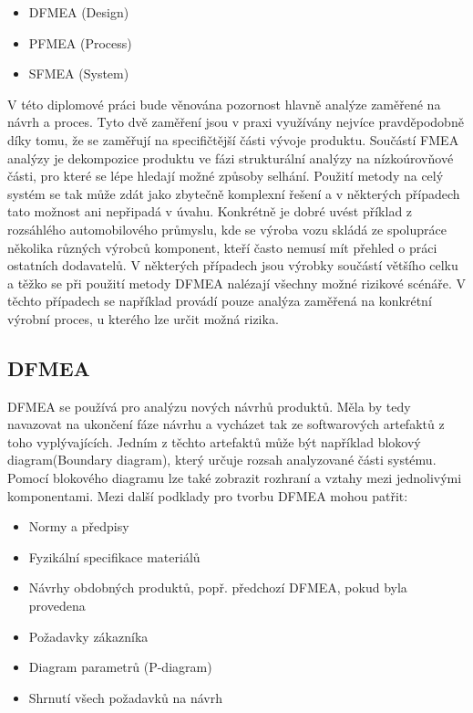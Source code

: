 \begin{itemize}
	\item  DFMEA (Design)
	\item  PFMEA (Process)
	\item  SFMEA (System)
\end{itemize}

V této diplomové práci bude věnována pozornost hlavně analýze zaměřené na návrh a proces. Tyto dvě zaměření jsou v praxi využívány nejvíce pravděpodobně díky tomu, že se zaměřují na specifičtější části vývoje produktu. Součástí FMEA analýzy je dekompozice produktu ve fázi strukturální analýzy na nízkoúrovňové části, pro které se lépe hledají možné způsoby selhání. Použití metody na celý systém se tak může zdát jako zbytečně komplexní řešení a v některých případech tato možnost ani nepřipadá v úvahu. Konkrétně je dobré uvést příklad z rozsáhlého automobilového průmyslu, kde se výroba vozu skládá ze spolupráce několika různých výrobců komponent, kteří často nemusí mít přehled o práci ostatních dodavatelů. V některých případech jsou výrobky součástí většího celku a těžko se při použití metody DFMEA nalézají všechny možné rizikové scénáře. V těchto případech se například provádí pouze analýza zaměřená na konkrétní výrobní proces, u kterého lze určit možná rizika. 

\subsection{DFMEA}
\label{subsec:DFMEA}
DFMEA se používá pro analýzu nových návrhů produktů. \cite{dfmea} Měla by tedy navazovat na ukončení fáze návrhu a vycházet tak ze softwarových artefaktů z toho vyplývajících. Jedním z těchto artefaktů může být například blokový diagram(Boundary diagram), který určuje rozsah analyzované části systému. Pomocí blokového diagramu lze také zobrazit rozhraní a vztahy mezi jednolivými komponentami. Mezi další podklady pro tvorbu DFMEA mohou patřit: 
\begin{itemize}
	\item  Normy a předpisy
	\item  Fyzikální specifikace materiálů
	\item  Návrhy obdobných produktů, popř. předchozí DFMEA, pokud byla provedena
	\item  Požadavky zákazníka
	\item  Diagram parametrů (P-diagram)
	\item  Shrnutí všech požadavků na návrh
\end{itemize}



